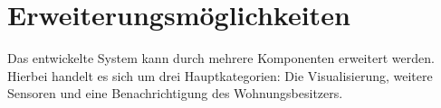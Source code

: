 \section{Erweiterungsm\"oglichkeiten}\label{s:Erweiterungsmoeglichkeiten}

Das entwickelte System kann durch mehrere Komponenten erweitert werden. Hierbei handelt es sich um drei Hauptkategorien: Die Visualisierung, weitere Sensoren und eine Benachrichtigung des Wohnungsbesitzers.



